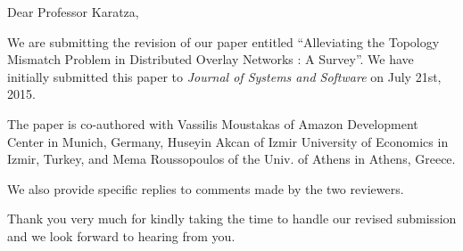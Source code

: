 \documentclass[11pt]{article}
\begin{document}


\begin{letter}{Dear Professor Karatza, }

\baselineskip

We are submitting the revision of our paper entitled 
``Alleviating the Topology Mismatch Problem in Distributed Overlay Networks
: A Survey''. We have initially submitted this paper to 
{\it Journal of Systems and Software} on July 21st, 2015.

The paper is co-authored with Vassilis Moustakas 
of Amazon Development Center in Munich, Germany, 
Huseyin Akcan of Izmir University of Economics in 
Izmir, Turkey,  and 
Mema Roussopoulos of the Univ. of Athens in Athens, Greece.

We also provide specific replies to comments made by the 
two reviewers. 

Thank you very much for kindly taking the time to handle our 
revised submission and we look forward to hearing from you.


\end{letter}
\end{document}
